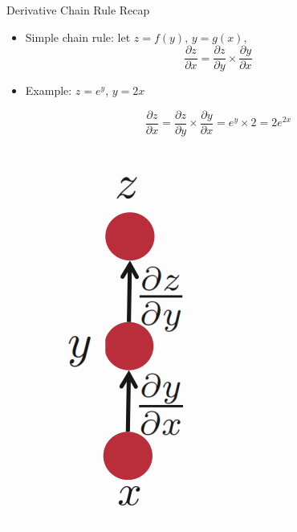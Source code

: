 \documentclass[handout]{beamer}
\begin{document}
\begin{frame}{Derivative Chain Rule Recap}
\begin{scriptsize}


\begin{itemize}
\item Simple chain rule: let $z = f(y)$, $y = g(x)$, 
\begin{displaymath}
\frac{\partial z}{\partial x} = \frac{\partial z}{\partial y} \times \frac{\partial y}{\partial x}
\end{displaymath}

\item  Example: $z= e^{y}$, $y = 2x$ 

\begin{displaymath}
\frac{\partial z}{\partial x} = \frac{\partial z}{\partial y} \times \frac{\partial y}{\partial x} = e^{y} \times 2 = 2 e^{2x}
\end{displaymath}


\end{itemize}


\begin{figure}[htb]
	\centering
	 \includegraphics[scale=0.2]{pics/simple_chain_rule.png}
\end{figure}


\end{scriptsize}
\end{frame}
\end{document}
